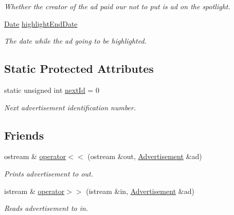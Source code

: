\begin{DoxyCompactItemize}
\begin{DoxyCompactList}\small\item\em Whether the creator of the ad paid our not to put is ad on the spotlight. \end{DoxyCompactList}\item 
\hypertarget{class_advertisement_a0cc102883ab94e2d547597a7b51eee43}{}\hyperlink{class_date}{Date} \hyperlink{class_advertisement_a0cc102883ab94e2d547597a7b51eee43}{highlight\+End\+Date}\label{class_advertisement_a0cc102883ab94e2d547597a7b51eee43}

\begin{DoxyCompactList}\small\item\em The date while the ad going to be highlighted. \end{DoxyCompactList}\end{DoxyCompactItemize}
\subsection*{Static Protected Attributes}
\begin{DoxyCompactItemize}
\item 
\hypertarget{class_advertisement_a0b5a0f2ec778aba63d0dd24bb3b2675b}{}static unsigned int \hyperlink{class_advertisement_a0b5a0f2ec778aba63d0dd24bb3b2675b}{next\+Id} = 0\label{class_advertisement_a0b5a0f2ec778aba63d0dd24bb3b2675b}

\begin{DoxyCompactList}\small\item\em Next advertisement identification number. \end{DoxyCompactList}\end{DoxyCompactItemize}
\subsection*{Friends}
\begin{DoxyCompactItemize}
\item 
ostream \& \hyperlink{class_advertisement_af6ba8e9ebe3c64e17263cbbcaa8bbb59}{operator$<$$<$} (ostream \&out, \hyperlink{class_advertisement}{Advertisement} \&ad)
\begin{DoxyCompactList}\small\item\em Prints advertisement to out. \end{DoxyCompactList}\item 
istream \& \hyperlink{class_advertisement_a5180e86255ebd01c83666f431b910bb4}{operator$>$$>$} (istream \&in, \hyperlink{class_advertisement}{Advertisement} \&ad)
\begin{DoxyCompactList}\small\item\em Reads advertisement to in. \end{DoxyCompactList}\end{DoxyCompactItemize}


